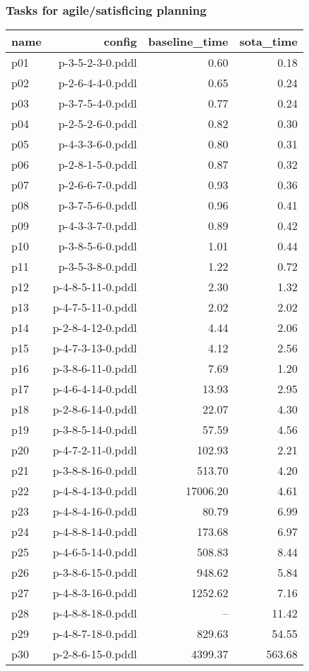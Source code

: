 \documentclass{article}
\begin{document}
                    \subsubsection*{Tasks for agile/satisficing planning}
                    
                            \begin{center}
                            \scriptsize
                            \begin{tabular}{@{}l|r|r|r@{}}
                            name & config & baseline\_time & sota\_time\\\midrule
                              p01& p-3-5-2-3-0.pddl&0.60&0.18\\
  p02& p-2-6-4-4-0.pddl&0.65&0.24\\
  p03& p-3-7-5-4-0.pddl&0.77&0.24\\
  p04& p-2-5-2-6-0.pddl&0.82&0.30\\
  p05& p-4-3-3-6-0.pddl&0.80&0.31\\
  p06& p-2-8-1-5-0.pddl&0.87&0.32\\
  p07& p-2-6-6-7-0.pddl&0.93&0.36\\
  p08& p-3-7-5-6-0.pddl&0.96&0.41\\
  p09& p-4-3-3-7-0.pddl&0.89&0.42\\
  p10& p-3-8-5-6-0.pddl&1.01&0.44\\
  p11& p-3-5-3-8-0.pddl&1.22&0.72\\
  p12& p-4-8-5-11-0.pddl&2.30&1.32\\
  p13& p-4-7-5-11-0.pddl&2.02&2.02\\
  p14& p-2-8-4-12-0.pddl&4.44&2.06\\
  p15& p-4-7-3-13-0.pddl&4.12&2.56\\
  p16& p-3-8-6-11-0.pddl&7.69&1.20\\
  p17& p-4-6-4-14-0.pddl&13.93&2.95\\
  p18& p-2-8-6-14-0.pddl&22.07&4.30\\
  p19& p-3-8-5-14-0.pddl&57.59&4.56\\
  p20& p-4-7-2-11-0.pddl&102.93&2.21\\
  p21& p-3-8-8-16-0.pddl&513.70&4.20\\
  p22& p-4-8-4-13-0.pddl&17006.20&4.61\\
  p23& p-4-8-4-16-0.pddl&80.79&6.99\\
  p24& p-4-8-8-14-0.pddl&173.68&6.97\\
  p25& p-4-6-5-14-0.pddl&508.83&8.44\\
  p26& p-3-8-6-15-0.pddl&948.62&5.84\\
  p27& p-4-8-3-16-0.pddl&1252.62&7.16\\
  p28& p-4-8-8-18-0.pddl&--&11.42\\
  p29& p-4-8-7-18-0.pddl&829.63&54.55\\
  p30& p-2-8-6-15-0.pddl&4399.37&563.68
                            \end{tabular}
                            \end{center}
                    
\end{document}
